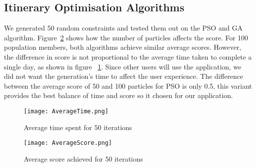 \subsection{Itinerary Optimisation Algorithms}

We generated 50 random constraints and tested them out
on the PSO and GA algorithm. Figure~\ref{AverageScore} shows how the number of
particles affects the score. For 100 population
members, both algorithms achieve similar average
scores. However, the difference in score is not
proportional to the average time taken to complete a
single day, as shown in figure ~\ref{AverageTime}. Since other users will use
the application, we did not
want the generation's time to affect the user
experience. The difference between the average
score of 50 and 100 particles for PSO is only 0.5,
this variant provides the best balance of time and
score so it chosen for our
application.   


\begin{figure}[h]
\centering
\texttt{[image: AverageTime.png]}
\caption{Average time spent for 50 iterations}
\label{AverageTime}
\end{figure}

\begin{figure}[h]
\centering
\texttt{[image: AverageScore.png]}
\caption{Average score achieved for 50 iterations}
\label{AverageScore}
\end{figure}
